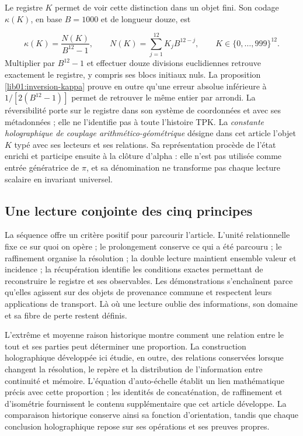 Le registre \(K\) permet de voir cette distinction dans un objet fini. Son
codage \(\kappa(K)\), en base \(B=1000\) et de longueur douze, est

\[
 \kappa(K)=\frac{N(K)}{B^{12}-1},\qquad
 N(K)=\sum_{j=1}^{12}K_jB^{12-j},\qquad
 K\in\{0,\ldots,999\}^{12}.
\]
Multiplier par \(B^{12}-1\) et effectuer douze divisions euclidiennes
retrouve exactement le registre, y compris ses blocs initiaux nuls.
La proposition \cref{lib01:inversion-kappa} prouve en outre qu’une erreur
absolue inférieure à \(1/[2(B^{12}-1)]\) permet de retrouver le même entier
par arrondi. La réversibilité porte sur le registre dans son système de coordonnées et
avec ses métadonnées ; elle ne l’identifie pas à toute l’histoire TPK. La
\emph{constante holographique de couplage arithmético-géométrique} désigne
dans cet article l’objet \(K\) typé avec ses lecteurs et ses relations. Sa
représentation procède de l’état enrichi et participe ensuite à la
clôture d’alpha : elle n’est pas utilisée comme entrée génératrice de \(\pi\), et
sa dénomination ne transforme pas chaque lecture scalaire en invariant universel.

\subsection*{Une lecture conjointe des cinq principes
}

La séquence offre un critère positif pour parcourir l’article. L’unité
relationnelle fixe ce sur quoi on opère ; le prolongement conserve ce qui a été parcouru ; le
raffinement organise la résolution ; la double lecture maintient ensemble valeur
et incidence ; la récupération identifie les conditions exactes permettant de
reconstruire le registre et ses observables. Les démonstrations s’enchaînent
parce qu’elles agissent sur des objets de provenance commune et respectent leurs applications de
transport. Là où une lecture oublie des informations, son domaine et sa
fibre de perte restent définis.


L’extrême et moyenne raison historique montre comment une relation entre le tout
et ses parties peut déterminer une proportion. La construction holographique
développée ici étudie, en outre, des relations conservées lorsque changent la
résolution, le repère et la distribution de l’information entre continuité et
mémoire. L’équation d’auto-échelle établit un lien mathématique précis
avec cette proportion ; les identités de concaténation, de raffinement et
d’isométrie fournissent le contenu supplémentaire que cet article développe.
La comparaison historique conserve ainsi sa fonction d’orientation, tandis que
chaque conclusion holographique repose sur ses opérations et ses preuves propres.

